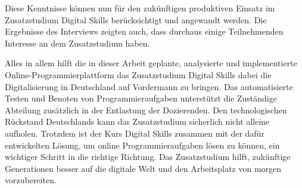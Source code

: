 Diese Kenntnisse können nun für den zukünftigen produktiven Einsatz im
Zusatzstudium Digital Skills berücksichtigt und angewandt werden. Die Ergebnisse
des Interviews zeigten auch, dass durchaus einige Teilnehmenden Interesse an dem
Zusatzstudium haben.

Alles in allem hilft die in dieser Arbeit geplante, analysierte und
implementierte Online-Programmierplattform das Zusatzstudium Digital Skills
dabei die Digitalisierung in Deutschland auf Vordermann zu bringen. Das
automatisierte Testen und Benoten von Programmieraufgaben unterstützt die
Zuständige Abteilung zusätzlich in der Entlastung der Dozierenden. Den
technologischen Rückstand Deutschlands kann das Zusatzstudium sicherlich nicht
alleine aufholen. Trotzdem ist der Kurs Digital Skills zusammen mit der
dafür entwickelten Lösung, um online Programmieraufgaben lösen zu können, ein
wichtiger Schritt in die richtige Richtung. Das Zusatzstudium hilft, zukünftige
Generationen besser auf die digitale Welt und den Arbeitsplatz von morgen
vorzubereiten.
